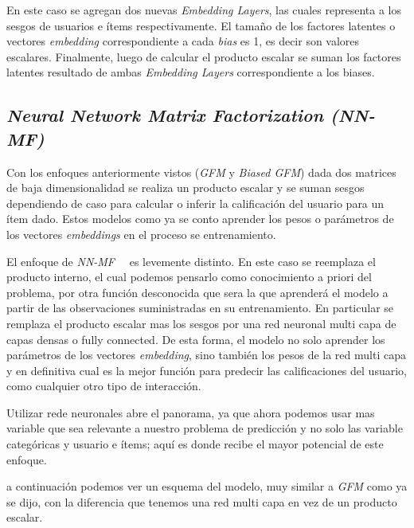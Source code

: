 \documentclass[11pt,a4paper,twoside]{thesis}
\begin{document}
En este caso se agregan dos nuevas \textit{Embedding Layers}, las cuales
representa a los sesgos de usuarios e ítems respectivamente. El tamaño de los
factores latentes o vectores \textit{embedding} correspondiente a cada
\textit{bias} es 1, es decir son valores escalares. Finalmente, luego de
calcular el producto escalar se suman los factores latentes resultado de ambas
\textit{Embedding Layers} correspondiente a los biases.

\clearpage

\subsection{\textit{Neural Network Matrix Factorization (NN-MF)}}

Con los enfoques anteriormente vistos (\textit{GFM} y \textit{Biased GFM}) dada
dos matrices de baja dimensionalidad se realiza un producto escalar y se suman
sesgos dependiendo de caso para calcular o inferir la calificación del usuario
para un ítem dado. Estos modelos como ya se conto aprender los pesos o
parámetros de los vectores \textit{embeddings} en el proceso se entrenamiento.

El enfoque de {\textit{NN-MF}}~\cite{nnfm}~\cite{ncf} es levemente distinto. En
este caso se reemplaza el producto interno, el cual podemos pensarlo como
conocimiento a priori del problema, por otra función desconocida que sera la
que aprenderá el modelo a partir de las observaciones suministradas en su
entrenamiento. En particular se remplaza el producto escalar mas los sesgos por
una red neuronal multi capa de capas densas o fully connected. De esta forma,
el modelo no solo aprender los parámetros de los vectores \textit{embedding},
sino también los pesos de la red multi capa y en definitiva cual es la mejor
función para predecir las calificaciones del usuario, como cualquier otro tipo
de interacción.

Utilizar rede neuronales abre el panorama, ya que ahora podemos usar mas
variable que sea relevante a nuestro problema de predicción y no solo las
variable categóricas y usuario e ítems; aquí es donde recibe el mayor potencial
de este enfoque.

a continuación podemos ver un esquema del modelo, muy similar a \textit{GFM}
como ya se dijo, con la diferencia que tenemos una red multi capa en vez de un
producto escalar.
\end{document}
